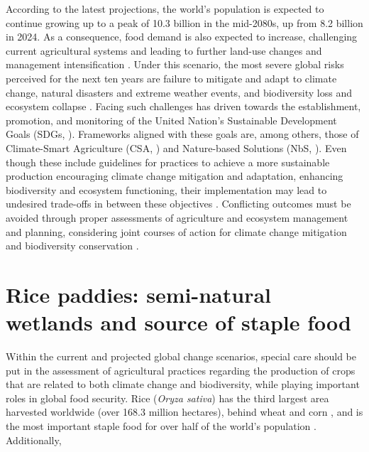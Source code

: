 According to the latest \cite{UN2024} projections, the world's population is expected to continue growing up to a peak of 10.3 billion in the mid-2080s, up from 8.2 billion in 2024. As a consequence, food demand is also expected to increase, challenging current agricultural systems and leading to further land-use changes and management intensification \citep{rogelj2018scenarios}. Under this scenario, the most severe global risks perceived for the next ten years are failure to mitigate and adapt to climate change, natural disasters and extreme weather events, and biodiversity loss and ecosystem collapse \citep{worldeconomicforum.2023}. Facing such challenges has driven towards the establishment, promotion, and monitoring of the United Nation's Sustainable Development Goals (SDGs, \cite{un2015transforming}). Frameworks aligned with these goals are, among others, those of Climate-Smart Agriculture (CSA, \cite{fao2011climate}) and Nature-based Solutions (NbS, \cite{noauthor_2020-su}). Even though these include guidelines for practices to achieve a more sustainable production encouraging climate change mitigation and adaptation, enhancing biodiversity and ecosystem functioning, their implementation may lead to undesired trade-offs in between these objectives \citep{seddon2019, smith2022, tripathi2022}. Conflicting outcomes must be avoided through proper assessments of agriculture and ecosystem management and planning, considering joint courses of action for climate change mitigation and biodiversity conservation \citep{rusch2022}.\\ %
 
\section*{Rice paddies: semi-natural wetlands and source of staple food}

Within the current and projected global change scenarios, special care should be put in the assessment of agricultural practices regarding the production of crops that are related to both climate change and biodiversity, while playing important roles in global food security. Rice (\textit{Oryza sativa}) has the third largest area harvested worldwide (over 168.3 million hectares), behind wheat and corn \citep{fao2023a}, and is the most important staple food for over half of the world's population \citep{seck2012crops}. Additionally, 

